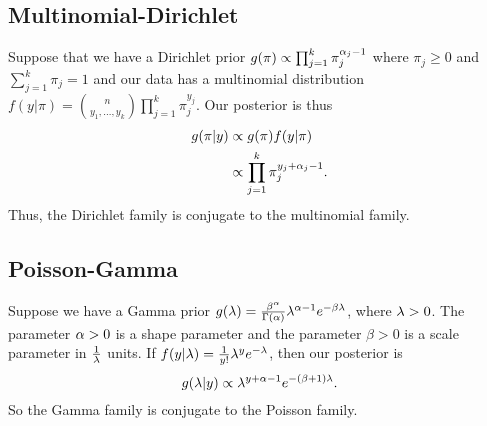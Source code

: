 \subsection{Multinomial-Dirichlet}
Suppose that we have a Dirichlet prior $g(\pi) \propto \prod_{j=1}^k \pi_j^{{\alpha}_j-1}$ where $\pi_j \ge 0$ and $\sum_{j=1}^k \pi_j = 1$ and our data has a multinomial distribution $f(y|\pi) = \binom{n}{y_1,\ldots,y_k}\prod_{j=1}^k \pi_j^{y_j}$. Our posterior is thus
\begin{align*}
    g(\pi|y) &\propto g(\pi)f(y|\pi)\\
    &\propto \prod_{j=1}^k \pi_j^{y_j+{\alpha}_j-1}.
\end{align*} 
Thus, the Dirichlet family is conjugate to the multinomial family.
\subsection{Poisson-Gamma}
Suppose we have a Gamma prior $g(\lambda) = \frac{\beta^{\alpha}}{\Gamma({\alpha})}\lambda^{{\alpha}-1} e^{-\beta \lambda}$, where $\lambda > 0$. The parameter ${\alpha}>0$ is a shape parameter and the parameter $\beta>0$ is a scale parameter in $\frac{1}{\lambda}$ units. If $f(y|\lambda) = \frac{1}{y!} \lambda^y e^{-\lambda}$, then our posterior is
\[g(\lambda|y) \propto \lambda^{y+{\alpha}-1}e^{-(\beta+1)\lambda}. \]
So the Gamma family is conjugate to the Poisson family.
